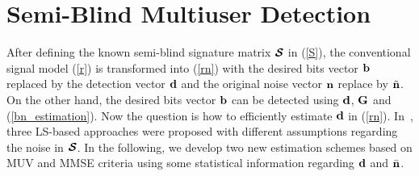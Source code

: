\documentclass[a4paper,10pt,fleqn, twocolumn]{IEEETran}
\newcommand{\bb}{{\bf b}}
\newcommand{\bd}{{\bf d}}
\newcommand{\bG}{{\bf G}}
\newcommand{\bn}{{\bf n}}
\newcommand{\bcS}{{\mbox {\boldmath ${\cal S}$}}}
\begin{document}
\section{Semi-Blind Multiuser Detection}
After defining the known semi-blind signature matrix $\bcS$ in
(\ref{S}), the conventional signal model (\ref{r}) is transformed
into (\ref{rn}) with the desired bits vector $\bb$ replaced by the
detection vector $\bd$ and the original noise vector $\bn$ replace
by $\tilde{\bn}$. On the other hand, the desired bits vector $\bb$
can be detected using $\bd$, $\bG$ and (\ref{bn_estimation}). Now
the question is how to efficiently estimate $\bd$ in (\ref{rn}).
In~\cite{Wang03d,Wang03e}, three LS-based approaches were proposed
with different assumptions regarding the noise in $\bcS$. In the
following, we develop two new estimation schemes based on MUV and
MMSE criteria using some statistical information regarding $\bd$
and $\bar\bn$.
\end{document}

